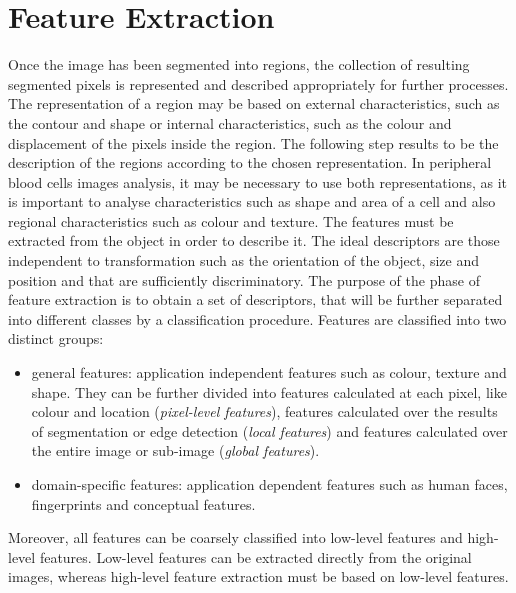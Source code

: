 \documentclass[final,a4paper,12pt,english]{UnicaPhdThesis3}
\begin{document}
	\chapter{Feature Extraction} %
	Once the image has been segmented into regions, the collection of resulting segmented pixels is represented and described appropriately for further processes. The representation of a region may be based on external characteristics, such as the contour and shape or internal characteristics, such as the colour and displacement of the pixels inside the region. The following step results to be the description of the regions according to the chosen representation. In peripheral blood cells images analysis, it may be necessary to use both representations, as it is important to analyse characteristics such as shape and area of a cell and also regional characteristics such as colour and texture. The features must be extracted from the object in order to describe it.
	The ideal descriptors are those independent to transformation such as the orientation of the object, size and position and that are sufficiently discriminatory. The purpose of the phase of feature extraction is to obtain a set of descriptors, that will be further separated into different classes by a classification procedure. Features are classified into two distinct groups:
	\begin{itemize}
		\item general features: application independent features such as colour, texture and shape. They can be further divided into features calculated at each pixel, like colour and location (\textit{pixel-level features}), features calculated over the results of segmentation or edge detection (\textit{local features}) and features calculated over the entire image or sub-image (\textit{global features}).
		\item domain-specific features: application dependent features such as human faces, fingerprints and conceptual features.
	\end{itemize}
	Moreover, all features can be coarsely classified into low-level features and high-level features. Low-level features can be extracted directly from the original images, whereas high-level feature extraction must be based on low-level features. 
	
\end{document}
